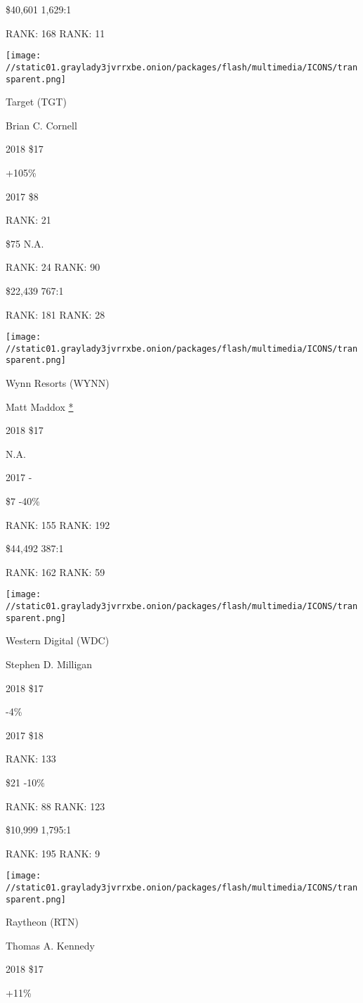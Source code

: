  \$40,601 1,629:1

RANK: 168 RANK: 11

\texttt{[image: //static01.graylady3jvrrxbe.onion/packages/flash/multimedia/ICONS/transparent.png]}

Target (TGT)

Brian C. Cornell \protect\hyperlink{g-footnotes}{}

2018 \$17

 +105\%

2017 \$8

RANK: 21

 \$75 N.A.

RANK: 24 RANK: 90

 \$22,439 767:1

RANK: 181 RANK: 28

\texttt{[image: //static01.graylady3jvrrxbe.onion/packages/flash/multimedia/ICONS/transparent.png]}

Wynn Resorts (WYNN)

Matt Maddox \protect\hyperlink{g-footnotes}{*}

2018 \$17

 N.A.

2017 -

 \$7 -40\%

RANK: 155 RANK: 192

 \$44,492 387:1

RANK: 162 RANK: 59

\texttt{[image: //static01.graylady3jvrrxbe.onion/packages/flash/multimedia/ICONS/transparent.png]}

Western Digital (WDC)

Stephen D. Milligan \protect\hyperlink{g-footnotes}{}

2018 \$17

 -4\%

2017 \$18

RANK: 133

 \$21 -10\%

RANK: 88 RANK: 123

 \$10,999 1,795:1

RANK: 195 RANK: 9

\texttt{[image: //static01.graylady3jvrrxbe.onion/packages/flash/multimedia/ICONS/transparent.png]}

Raytheon (RTN)

Thomas A. Kennedy \protect\hyperlink{g-footnotes}{}

2018 \$17

 +11\%

